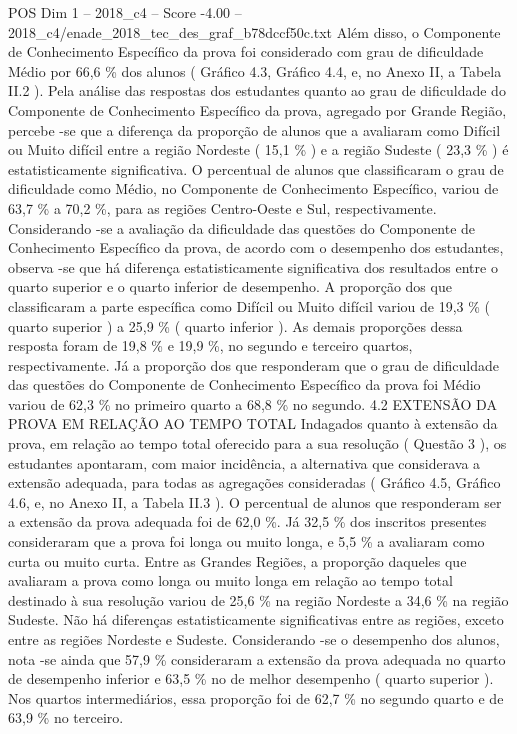 \begin{textsample}{POS Dim 1 – 2018\_c4 – Score -4.00 – 2018\_c4/enade\_2018\_tec\_des\_graf\_b78dccf50c.txt}
Além disso, o Componente de Conhecimento Específico da prova foi considerado com grau de dificuldade Médio por 66,6 \% dos alunos ( Gráfico 4.3, Gráfico 4.4, e, no Anexo II, a Tabela II.2 ).
Pela análise das respostas dos estudantes quanto ao grau de dificuldade do Componente de Conhecimento Específico da prova, agregado por Grande Região, percebe -se que a diferença da proporção de alunos que a avaliaram como Difícil ou Muito difícil entre a região Nordeste ( 15,1 \% ) e a região Sudeste ( 23,3 \% ) é estatisticamente significativa.
O percentual de alunos que classificaram o grau de dificuldade como Médio, no Componente de Conhecimento Específico, variou de 63,7 \% a 70,2 \%, para as regiões Centro-Oeste e Sul, respectivamente.
Considerando -se a avaliação da dificuldade das questões do Componente de Conhecimento Específico da prova, de acordo com o desempenho dos estudantes, observa -se que há diferença estatisticamente significativa dos resultados entre o quarto superior e o quarto inferior de desempenho.
A proporção dos que classificaram a parte específica como Difícil ou Muito difícil variou de 19,3 \% ( quarto superior ) a 25,9 \% ( quarto inferior ).
As demais proporções dessa resposta foram de 19,8 \% e 19,9 \%, no segundo e terceiro quartos, respectivamente.
Já a proporção dos que responderam que o grau de dificuldade das questões do Componente de Conhecimento Específico da prova foi Médio variou de 62,3 \% no primeiro quarto a 68,8 \% no segundo. 4.2 EXTENSÃO DA PROVA EM RELAÇÃO AO TEMPO TOTAL Indagados quanto à extensão da prova, em relação ao tempo total oferecido para a sua resolução ( Questão 3 ), os estudantes apontaram, com maior incidência, a alternativa que considerava a extensão adequada, para todas as agregações consideradas ( Gráfico 4.5, Gráfico 4.6, e, no Anexo II, a Tabela II.3 ).
O percentual de alunos que responderam ser a extensão da prova adequada foi de 62,0 \%.
Já 32,5 \% dos inscritos presentes consideraram que a prova foi longa ou muito longa, e 5,5 \% a avaliaram como curta ou muito curta.
Entre as Grandes Regiões, a proporção daqueles que avaliaram a prova como longa ou muito longa em relação ao tempo total destinado à sua resolução variou de 25,6 \% na região Nordeste a 34,6 \% na região Sudeste.
Não há diferenças estatisticamente significativas entre as regiões, exceto entre as regiões Nordeste e Sudeste.
Considerando -se o desempenho dos alunos, nota -se ainda que 57,9 \% consideraram a extensão da prova adequada no quarto de desempenho inferior e 63,5 \% no de melhor desempenho ( quarto superior ).
Nos quartos intermediários, essa proporção foi de 62,7 \% no segundo quarto e de 63,9 \% no terceiro.

\end{textsample}
